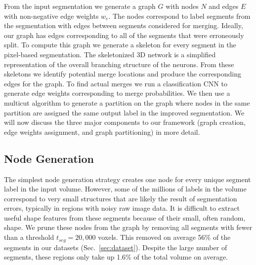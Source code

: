 From the input segmentation we generate a graph $G$ with nodes $N$ and edges $E$ with non-negative edge weights $w_e$. The nodes correspond to label segments from the segmentation with edges between segments considered for merging. Ideally, our graph has edges corresponding to all of the segments that were erroneously split. To compute this graph we generate a skeleton for every segment in the pixel-based segmentation. The skeletonized 3D network is a simplified representation of the overall branching structure of the neurons. From these skeletons we identify potential merge locations and produce the corresponding edges for the graph. To find actual merges we run a classification CNN to generate edge weights corresponding to merge probabilities. We then use a multicut algorithm to generate a partition on the graph where nodes in the same partition are assigned the same output label in the improved segmentation. We will now discuss the three major components to our framework (graph creation, edge weights assignment, and graph partitioning) in more detail.



\subsection{Node Generation}
\label{sec:skeletonization}

The simplest node generation strategy creates one node for every unique segment label in the input volume. However, some of the millions of labels in the volume correspond to very small structures that are likely the result of segmentation errors, typically in regions with noisy raw image data. It is difficult to extract useful shape features from these segments because of their small, often random, shape. We prune these nodes from the graph by removing all segments with fewer than a threshold $t_{seg} = 20,000$ voxels. This removed on average 56\% of the segments in our  datasets (Sec.~\ref{sec:dataset}). Despite the large number of segments, these regions only take up 1.6\% of the total volume on average.

